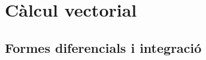 \documentclass[../Apunts.tex]{subfiles}
\begin{document}

\begin{comment}
	Calcular curvatura de Gauss i curvatura mitjana d'un helicoide. (6.7)
	\[\varphi(u,v)=(u\cos(v),u\sin(v),av).\]
	Línies de curvatura (7.3)
	Fer-ho tot per helicoides lol
\end{comment}


\chapter{Càlcul vectorial}
\section{Formes diferencials i integració}
\end{document}
